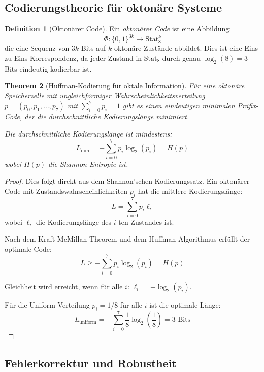 \documentclass[12pt, a4paper]{article}
\newtheorem{theorem}{Theorem}[section]
\theoremstyle{definition}
\newtheorem{definition}[theorem]{Definition}
\theoremstyle{remark}
\newcommand{\Stat}{\mathrm{Stat}}
\begin{document}
\subsection{Codierungstheorie für oktonäre Systeme}
\label{subsec:codierungstheorie_oktonaer}

\begin{definition}[Oktonärer Code]
\label{def:oktonaerer_code}
Ein \emph{oktonärer Code} ist eine Abbildung:
\[
\Phi: \{0,1\}^{3k} \to \Stat_8^k
\]
die eine Sequenz von $3k$ Bits auf $k$ oktonäre Zustände abbildet. Dies ist eine Eins-zu-Eins-Korrespondenz, da jeder Zustand in $\Stat_8$ durch genau $\log_2(8) = 3$ Bits eindeutig kodierbar ist.
\end{definition}

\begin{theorem}[Huffman-Kodierung für oktale Information]
\label{thm:huffman_oktonaer}
Für eine oktonäre Speicherzelle mit ungleichförmiger Wahrscheinlichkeitsverteilung $p = (p_0, p_1, \ldots, p_7)$ mit $\sum_{i=0}^7 p_i = 1$ gibt es einen eindeutigen minimalen Präfix-Code, der die durchschnittliche Kodierungslänge minimiert.

Die durchschnittliche Kodierungslänge ist mindestens:
\[
L_{\min} = -\sum_{i=0}^7 p_i \log_2(p_i) = H(p)
\]
wobei $H(p)$ die Shannon-Entropie ist.
\end{theorem}

\begin{proof}
Dies folgt direkt aus dem Shannon'schen Kodierungssatz. Ein oktonärer Code mit Zustandswahrscheinlichkeiten $p_i$ hat die mittlere Kodierungslänge:
\[
L = \sum_{i=0}^7 p_i \ell_i
\]
wobei $\ell_i$ die Kodierungslänge des $i$-ten Zustandes ist.

Nach dem Kraft-McMillan-Theorem und dem Huffman-Algorithmus erfüllt der optimale Code:
\[
L \geq -\sum_{i=0}^7 p_i \log_2(p_i) = H(p)
\]

Gleichheit wird erreicht, wenn für alle $i$: $\ell_i = -\log_2(p_i)$.

Für die Uniform-Verteilung $p_i = 1/8$ für alle $i$ ist die optimale Länge:
\[
L_{\text{uniform}} = -\sum_{i=0}^7 \frac{1}{8} \log_2\left(\frac{1}{8}\right) = 3 \text{ Bits}
\]
\end{proof}

\subsection{Fehlerkorrektur und Robustheit}
\label{subsec:fehlerkorrektur_oktonaer}
\end{document}
